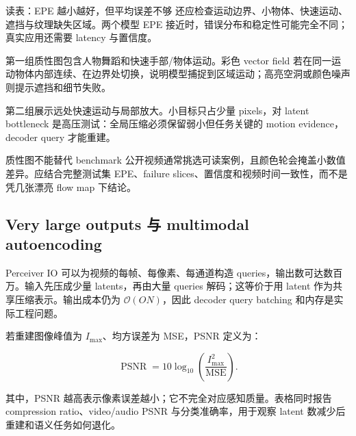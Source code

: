 \begin{knowledgebox}{读表：EPE 越小越好，但平均误差不够}
还应检查运动边界、小物体、快速运动、遮挡与纹理缺失区域。两个模型 EPE 接近时，错误分布和稳定性可能完全不同；真实应用还需要 latency 与置信度。
\end{knowledgebox}

第一组质性图包含人物舞蹈和快速手部/物体运动。彩色 vector field 若在同一运动物体内部连续、在边界处切换，说明模型捕捉到区域运动；高亮空洞或颜色噪声则提示遮挡和细节失败。


第二组展示远处快速运动与局部放大。小目标只占少量 pixels，对 latent bottleneck 是高压测试：全局压缩必须保留弱小但任务关键的 motion evidence，decoder query 才能重建。


\begin{warningbox}{质性图不能替代 benchmark}
公开视频通常挑选可读案例，且颜色轮会掩盖小数值差异。应结合完整测试集 EPE、failure slices、置信度和视频时间一致性，而不是凭几张漂亮 flow map 下结论。
\end{warningbox}

\subsection{Very large outputs 与 multimodal autoencoding}

Perceiver IO 可以为视频的每帧、每像素、每通道构造 queries，输出数可达数百万。输入先压成少量 latents，再由大量 queries 解码；这等价于用 latent 作为共享压缩表示。输出成本仍为 $\mathcal{O}(ON)$，因此 decoder query batching 和内存是实际工程问题。


若重建图像峰值为 $I_{\max}$、均方误差为 MSE，PSNR 定义为：

\[
\operatorname{PSNR}=10\log_{10}\left(\frac{I_{\max}^2}{\operatorname{MSE}}\right).
\]

其中，PSNR 越高表示像素误差越小；它不完全对应感知质量。表格同时报告 compression ratio、video/audio PSNR 与分类准确率，用于观察 latent 数减少后重建和语义任务如何退化。


